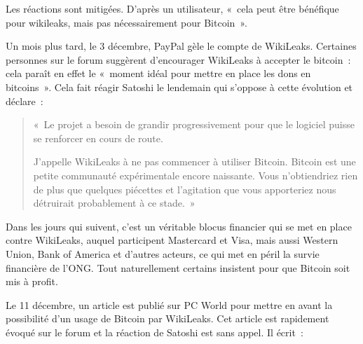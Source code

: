 Les réactions sont mitigées. D'après un utilisateur, «~cela peut être bénéfique pour wikileaks, mais pas nécessairement pour Bitcoin~».

Un mois plus tard, le 3 décembre, PayPal gèle le compte de WikiLeaks. Certaines personnes sur le forum suggèrent d'encourager WikiLeaks à accepter le bitcoin~: cela paraît en effet le «~moment idéal pour mettre en place les dons en bitcoins~». Cela fait réagir Satoshi le lendemain qui s'oppose à cette évolution et déclare~:

\begin{quote}
«~Le projet a besoin de grandir progressivement pour que le logiciel puisse se renforcer en cours de route.

J'appelle WikiLeaks à ne pas commencer à utiliser Bitcoin. Bitcoin est une petite communauté expérimentale encore naissante. Vous n'obtiendriez rien de plus que quelques piécettes et l'agitation que vous apporteriez nous détruirait probablement à ce stade.~»
\end{quote}

Dans les jours qui suivent, c'est un véritable blocus financier qui se met en place contre WikiLeaks, auquel participent Mastercard et Visa, mais aussi Western Union, Bank of America et d'autres acteurs, ce qui met en péril la survie financière de l'ONG. Tout naturellement certains insistent pour que Bitcoin soit mis à profit.

Le 11 décembre, un article est publié sur PC World pour mettre en avant la possibilité d'un usage de Bitcoin par WikiLeaks. Cet article est rapidement évoqué sur le forum et la réaction de Satoshi est sans appel. Il écrit~:

